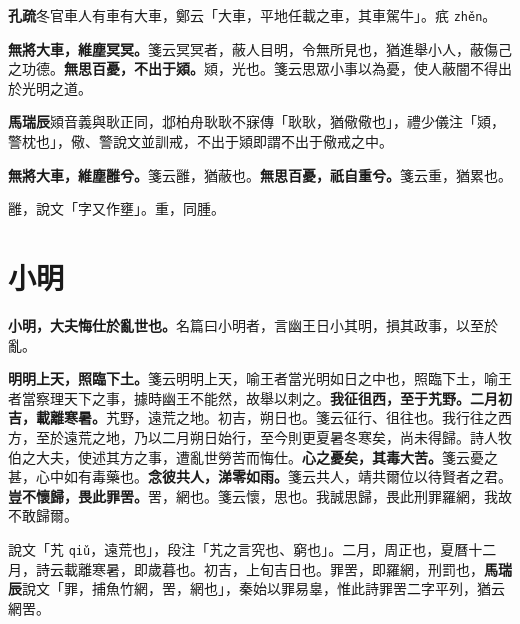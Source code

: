 \begin{quoting}\textbf{孔疏}冬官車人有車有大車，鄭云「大車，平地任載之車，其車駕牛」。疧 \texttt{zhěn}。\end{quoting}

\textbf{無將大車，維塵冥冥。}{\footnotesize 箋云冥冥者，蔽人目明，令無所見也，猶進舉小人，蔽傷己之功德。}\textbf{無思百憂，不出于熲。}{\footnotesize 熲，光也。箋云思眾小事以為憂，使人蔽闇不得出於光明之道。}

\begin{quoting}\textbf{馬瑞辰}熲音義與耿正同，邶柏舟耿耿不寐傳「耿耿，猶儆儆也」，禮少儀注「熲，警枕也」，儆、警說文並訓戒，不出于熲即謂不出于儆戒之中。\end{quoting}

\textbf{無將大車，維塵雝兮。}{\footnotesize 箋云雝，猶蔽也。}\textbf{無思百憂，祇自重兮。}{\footnotesize 箋云重，猶累也。}

\begin{quoting}雝，說文「字又作壅」。重，同腫。\end{quoting}

\section{小明}


\textbf{小明，大夫悔仕於亂世也。}{\footnotesize 名篇曰小明者，言幽王日小其明，損其政事，以至於亂。}

\textbf{明明上天，照臨下土。}{\footnotesize 箋云明明上天，喻王者當光明如日之中也，照臨下土，喻王者當察理天下之事，據時幽王不能然，故舉以刺之。}\textbf{我征徂西，至于艽野。二月初吉，載離寒暑。}{\footnotesize 艽野，遠荒之地。初吉，朔日也。箋云征行、徂往也。我行往之西方，至於遠荒之地，乃以二月朔日始行，至今則更夏暑冬寒矣，尚未得歸。詩人牧伯之大夫，使述其方之事，遭亂世勞苦而悔仕。}\textbf{心之憂矣，其毒大苦。}{\footnotesize 箋云憂之甚，心中如有毒藥也。}\textbf{念彼共人，涕零如雨。}{\footnotesize 箋云共人，靖共爾位以待賢者之君。}\textbf{豈不懷歸，畏此罪罟。}{\footnotesize 罟，網也。箋云懷，思也。我誠思歸，畏此刑罪羅網，我故不敢歸爾。}

\begin{quoting}說文「艽 \texttt{qiǔ}，遠荒也」，段注「艽之言究也、窮也」。二月，周正也，夏曆十二月，詩云載離寒暑，即歲暮也。初吉，上旬吉日也。罪罟，即羅網，刑罰也，\textbf{馬瑞辰}說文「罪，捕魚竹網，罟，網也」，秦始以罪易辠，惟此詩罪罟二字平列，猶云網罟。\end{quoting}

